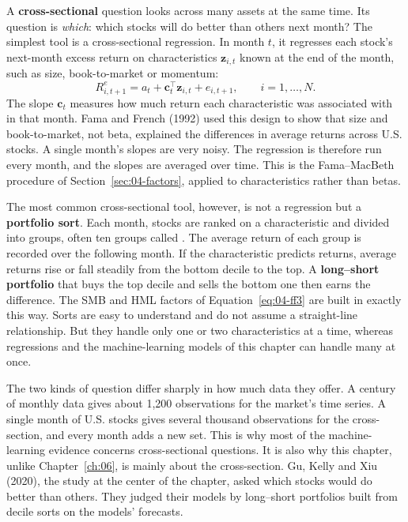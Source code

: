 A \textbf{cross-sectional} question looks across many assets at the same time. Its question is \emph{which}: which stocks will do better than others next month? The simplest tool is a cross-sectional regression. In month $t$, it regresses each stock's next-month excess return on characteristics $\mathbf{z}_{i,t}$ known at the end of the month, such as size, book-to-market or momentum:
\begin{equation}
  R^{e}_{i,t+1} = a_t + \mathbf{c}_t^{\top} \mathbf{z}_{i,t} + e_{i,t+1}, \qquad i = 1, \dots, N.
  \label{eq:20-xs}
\end{equation}
The slope $\mathbf{c}_t$ measures how much return each characteristic was associated with in that month. Fama and French (1992) used this design to show that size and book-to-market, not beta, explained the differences in average returns across U.S. stocks. A single month's slopes are very noisy. The regression is therefore run every month, and the slopes are averaged over time. This is the Fama--MacBeth procedure of Section~\ref{sec:04-factors}, applied to characteristics rather than betas.

The most common cross-sectional tool, however, is not a regression but a \textbf{portfolio sort}. Each month, stocks are ranked on a characteristic and divided into groups, often ten groups called . The average return of each group is recorded over the following month. If the characteristic predicts returns, average returns rise or fall steadily from the bottom decile to the top. A \textbf{long--short portfolio} that buys the top decile and sells the bottom one then earns the difference. The SMB and HML factors of Equation~\eqref{eq:04-ff3} are built in exactly this way. Sorts are easy to understand and do not assume a straight-line relationship. But they handle only one or two characteristics at a time, whereas regressions and the machine-learning models of this chapter can handle many at once.

The two kinds of question differ sharply in how much data they offer. A century of monthly data gives about 1,200 observations for the market's time series. A single month of U.S. stocks gives several thousand observations for the cross-section, and every month adds a new set. This is why most of the machine-learning evidence concerns cross-sectional questions. It is also why this chapter, unlike Chapter~\ref{ch:06}, is mainly about the cross-section. Gu, Kelly and Xiu (2020), the study at the center of the chapter, asked which stocks would do better than others. They judged their models by long--short portfolios built from decile sorts on the models' forecasts.

